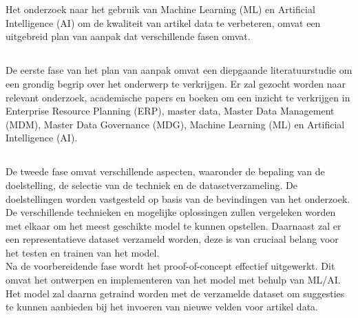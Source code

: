 
\chapter{}%
\label{ch:methodologie}

Het onderzoek naar het gebruik van Machine Learning (ML) en Artificial Intelligence (AI) om de kwaliteit van artikel data te verbeteren, omvat een uitgebreid plan van aanpak dat verschillende fasen omvat.

\section{}%
\label{sec:LiteratuurstudieM}
De eerste fase van het plan van aanpak omvat een diepgaande literatuurstudie om een grondig begrip over het onderwerp te verkrijgen. Er zal gezocht worden naar relevant onderzoek, academische papers en boeken om een inzicht te verkrijgen in Enterprise Resource Planning (ERP), master data, Master Data Management (MDM), Master Data Governance (MDG), Machine Learning (ML) en Artificial Intelligence (AI).

\section{}%
\label{sec:Proof-of-ConceptM}
De tweede fase omvat verschillende aspecten, waaronder de bepaling van de doelstelling, de selectie van de techniek en de datasetverzameling. De doelstellingen worden vastgesteld op basis van de bevindingen van het onderzoek. De verschillende technieken en mogelijke oplossingen zullen vergeleken worden met elkaar om het meest geschikte model te kunnen opstellen. Daarnaast zal er een representatieve dataset verzameld worden, deze is van cruciaal belang voor het testen en trainen van het model. 
\\Na de voorbereidende fase wordt het proof-of-concept effectief uitgewerkt. Dit omvat het ontwerpen en implementeren van het model met behulp van ML/AI. Het model zal daarna getraind worden met de verzamelde dataset om suggesties te kunnen aanbieden bij het invoeren van nieuwe velden voor artikel data. 

